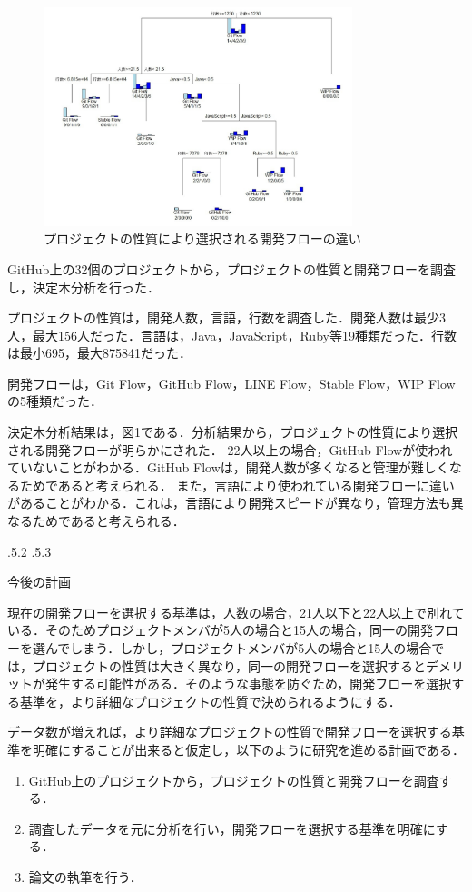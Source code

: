 \documentclass[uplatex]{jsarticle}
\makeatletter
\renewcommand{\section}{%
    \if@slide\clearpage\fi
    \@startsection{section}{1}{\z@}%
    {\Cvs \@plus.5\Cdp \@minus.2\Cdp}%
    {.5\Cvs \@plus.3\Cdp}%
    {\normalfont\raggedright}}
\makeatother
\begin{document}
\begin{figure}
\vspace*{-\intextsep}
\includegraphics[width=9cm,clip]{images.pdf}
\caption{プロジェクトの性質により選択される開発フローの違い}\label{決定木}
\end{figure}

GitHub上の32個のプロジェクトから，プロジェクトの性質と開発フローを調査し，決定木分析を行った．

プロジェクトの性質は，開発人数，言語，行数を調査した．開発人数は最少3人，最大156人だった．言語は，Java，JavaScript，Ruby等19種類だった．行数は最小695，最大875841だった．

開発フローは，Git Flow，GitHub Flow，LINE Flow，Stable Flow，WIP Flowの5種類だった．

決定木分析結果は，図1である．分析結果から，プロジェクトの性質により選択される開発フローが明らかにされた．
22人以上の場合，GitHub Flowが使われていないことがわかる．GitHub Flowは，開発人数が多くなると管理が難しくなるためであると考えられる．
また，言語により使われている開発フローに違いがあることがわかる．これは，言語により開発スピードが異なり，管理方法も異なるためであると考えられる．

\section{今後の計画}

現在の開発フローを選択する基準は，人数の場合，21人以下と22人以上で別れている．そのためプロジェクトメンバが5人の場合と15人の場合，同一の開発フローを選んでしまう．しかし，プロジェクトメンバが5人の場合と15人の場合では，プロジェクトの性質は大きく異なり，同一の開発フローを選択するとデメリットが発生する可能性がある．そのような事態を防ぐため，開発フローを選択する基準を，より詳細なプロジェクトの性質で決められるようにする．

データ数が増えれば，より詳細なプロジェクトの性質で開発フローを選択する基準を明確にすることが出来ると仮定し，以下のように研究を進める計画である．

\begin{enumerate}
\item GitHub上のプロジェクトから，プロジェクトの性質と開発フローを調査する．
\item 調査したデータを元に分析を行い，開発フローを選択する基準を明確にする．
\item 論文の執筆を行う．
\end{enumerate}

\end{document}
